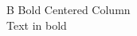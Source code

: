 \documentclass{article}
\begin{document}
\begin{tabular}{B}
Bold Centered Column\\
Text in bold\\
\end{tabular}
\end{document}
